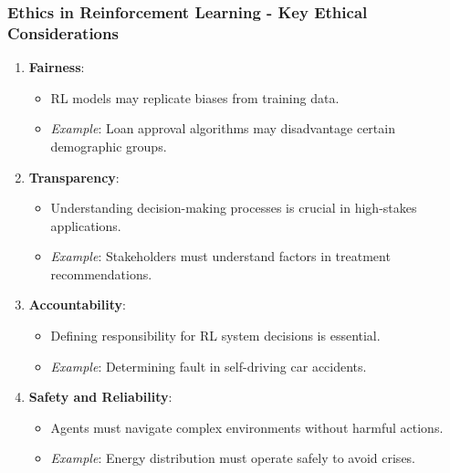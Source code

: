 \documentclass[aspectratio=169]{beamer}
\begin{document}
\begin{frame}[fragile]
    \frametitle{Ethics in Reinforcement Learning - Key Ethical Considerations}
    \begin{enumerate}
        \item \textbf{Fairness}:
            \begin{itemize}
                \item RL models may replicate biases from training data.
                \item \textit{Example}: Loan approval algorithms may disadvantage certain demographic groups.
            \end{itemize}

        \item \textbf{Transparency}:
            \begin{itemize}
                \item Understanding decision-making processes is crucial in high-stakes applications.
                \item \textit{Example}: Stakeholders must understand factors in treatment recommendations.
            \end{itemize}

        \item \textbf{Accountability}:
            \begin{itemize}
                \item Defining responsibility for RL system decisions is essential.
                \item \textit{Example}: Determining fault in self-driving car accidents.
            \end{itemize}

        \item \textbf{Safety and Reliability}:
            \begin{itemize}
                \item Agents must navigate complex environments without harmful actions.
                \item \textit{Example}: Energy distribution must operate safely to avoid crises.
            \end{itemize}
    \end{enumerate}
\end{frame}
\end{document}
